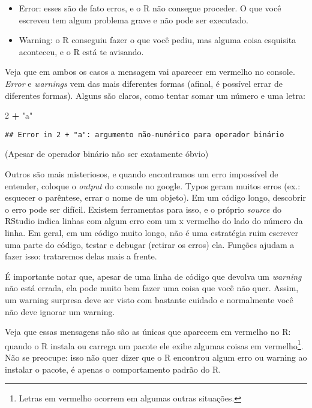 \documentclass[]{book}
\newenvironment{Shaded}{\begin{snugshade}}{\end{snugshade}}
\newcommand{\DecValTok}[1]{\textcolor[rgb]{0.00,0.00,0.81}{#1}}
\newcommand{\StringTok}[1]{\textcolor[rgb]{0.31,0.60,0.02}{#1}}
\newcommand{\OperatorTok}[1]{\textcolor[rgb]{0.81,0.36,0.00}{\textbf{#1}}}
\providecommand{\tightlist}{%
  \setlength{\itemsep}{0pt}\setlength{\parskip}{0pt}}
\let\rmarkdownfootnote\footnote%
\def\footnote{\protect\rmarkdownfootnote}
\begin{document}
\begin{itemize}
\tightlist
\item
  Error: esses são de fato erros, e o R não consegue proceder. O que
  você escreveu tem algum problema grave e não pode ser executado.
\item
  Warning: o R conseguiu fazer o que você pediu, mas alguma coisa
  esquisita aconteceu, e o R está te avisando.
\end{itemize}

Veja que em ambos os casos a mensagem vai aparecer em vermelho no
console. \emph{Error} e \emph{warnings} vem das mais diferentes formas
(afinal, é possível errar de diferentes formas). Alguns são claros, como
tentar somar um número e uma letra:

\begin{Shaded}
\begin{Highlighting}[]
\DecValTok{2} \OperatorTok{+}\StringTok{ "a"}
\end{Highlighting}
\end{Shaded}

\begin{verbatim}
## Error in 2 + "a": argumento não-numérico para operador binário
\end{verbatim}

(Apesar de operador binário não ser exatamente óbvio)

Outros são mais misteriosos, e quando encontramos um erro impossível de
entender, coloque o \emph{output} do console no google. Typos geram
muitos erros (ex.: esquecer o parêntese, errar o nome de um objeto). Em
um código longo, descobrir o erro pode ser difícil. Existem ferramentas
para isso, e o próprio \emph{source} do RStudio indica linhas com algum
erro com um x vermelho do lado do número da linha. Em geral, em um
código muito longo, não é uma estratégia ruim escrever uma parte do
código, testar e debugar (retirar os erros) ela. Funções ajudam a fazer
isso: trataremos delas mais a frente.

É importante notar que, apesar de uma linha de código que devolva um
\emph{warning} não está errada, ela pode muito bem fazer uma coisa que
você não quer. Assim, um warning surpresa deve ser visto com bastante
cuidado e normalmente você não deve ignorar um warning.

Veja que essas mensagens não são as únicas que aparecem em vermelho no
R: quando o R instala ou carrega um pacote ele exibe algumas coisas em
vermelho\footnote{Letras em vermelho ocorrem em algumas outras
  situações.}. Não se preocupe: isso não quer dizer que o R encontrou
algum erro ou warning ao instalar o pacote, é apenas o comportamento
padrão do R.
\end{document}
